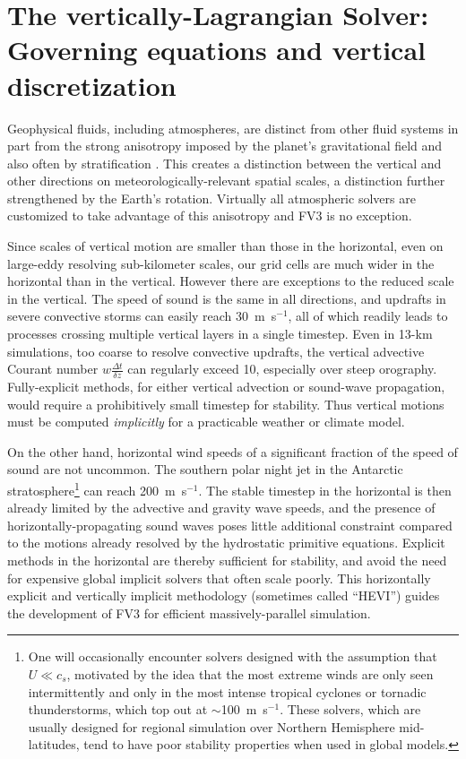 \documentclass[10pt,letterpaper,margin=1in]{memoir}
\begin{document}
\chapter{The vertically-Lagrangian Solver: Governing equations and vertical discretization} \label{chap:VLsolver}

Geophysical fluids, including atmospheres, are distinct from other fluid systems in part from the strong anisotropy imposed by the planet's gravitational field and also often by stratification \citep[, Chapters 15 and 16]{Tritton1977}. This creates a distinction between the vertical and other directions on meteorologically-relevant spatial scales, a distinction further strengthened by the Earth's rotation.  Virtually all atmospheric solvers are customized to take advantage of this anisotropy and FV3 is no exception. 

Since scales of vertical motion are smaller than those in the horizontal, even on large-eddy resolving sub-kilometer scales, our grid cells are much wider in the horizontal than in the vertical. However there are exceptions to the reduced scale in the vertical. The speed of sound is the same in all directions, and updrafts in severe convective storms can easily reach 30~m~s$^{-1}$, all of which readily leads to processes crossing multiple vertical layers in a single timestep. Even in 13-km simulations, too coarse to resolve convective updrafts, the vertical advective Courant number $w\frac{\Delta t}{\delta z}$ can regularly exceed 10, especially over steep orography. Fully-explicit methods, for either vertical advection or sound-wave propagation, would require a prohibitively small timestep for stability. Thus vertical motions must be computed \textit{implicitly} for a practicable weather or climate model.

On the other hand, horizontal wind speeds of a significant fraction of the speed of sound are not uncommon. The southern polar night jet in the Antarctic stratosphere\footnote{One will occasionally encounter solvers designed with the assumption that $U \ll c_s$, motivated by the idea that the most extreme winds are only seen intermittently and only in the most intense tropical cyclones or tornadic thunderstorms, which top out at $\sim$100~m~s$^{-1}$. These solvers, which are usually designed for regional simulation over Northern Hemisphere mid-latitudes, tend to have poor stability properties when used in global models.} can reach 200~m~s$^{-1}$. The stable timestep in the horizontal is then already limited by the advective and gravity wave speeds, and the presence of horizontally-propagating sound waves poses little additional constraint compared to the motions already resolved by the hydrostatic primitive equations. Explicit methods in the horizontal are thereby sufficient for stability, and avoid the need for expensive global implicit solvers that often scale poorly. This horizontally explicit and vertically implicit methodology (sometimes called ``HEVI'') guides the development of FV3 for efficient massively-parallel simulation.
\end{document}
